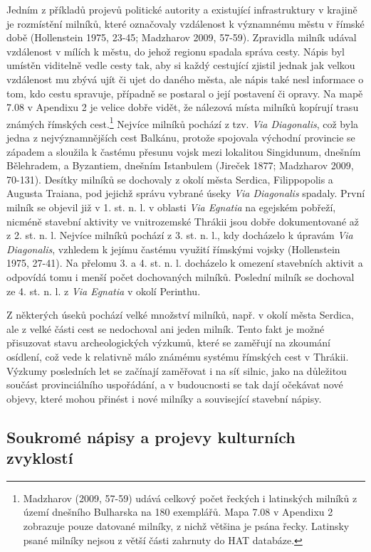 Jedním z příkladů projevů politické autority a existující infrastruktury v krajině je rozmístění milníků, které označovaly vzdálenost k významnému městu v římské době (Hollenstein 1975, 23-45; Madzharov 2009, 57-59). Zpravidla milník udával vzdálenost v mílích k městu, do jehož regionu spadala správa cesty. Nápis byl umístěn viditelně vedle cesty tak, aby si každý cestující zjistil jednak jak velkou vzdálenost mu zbývá ujít či ujet do daného města, ale nápis také nesl informace o tom, kdo cestu spravuje, případně se postaral o její postavení či opravy. Na mapě 7.08 v Apendixu 2 je velice dobře vidět, že nálezová místa milníků kopírují trasu známých římských cest.\footnote{Madzharov (2009, 57-59) udává celkový počet řeckých i latinských milníků z území dnešního Bulharska na 180 exemplářů. Mapa 7.08 v Apendixu 2 zobrazuje pouze datované milníky, z nichž většina je psána řecky. Latinsky psané milníky nejsou z větší části zahrnuty do HAT databáze.} Nejvíce milníků pochází z tzv. {\em Via Diagonalis}, což byla jedna z nejvýznamnějších cest Balkánu, protože spojovala východní provincie se západem a sloužila k častému přesunu vojsk mezi lokalitou Singidunum, dnešním Bělehradem, a Byzantiem, dnešním Istanbulem (Jireček 1877; Madzharov 2009, 70-131). Desítky milníků se dochovaly z okolí města Serdica, Filippopolis a Augusta Traiana, pod jejichž správu vybrané úseky {\em Via Diagonalis} spadaly. První milník se objevil již v 1. st. n. l. v oblasti {\em Via Egnatia} na egejském pobřeží, nicméně stavební aktivity ve vnitrozemské Thrákii jsou dobře dokumentované až z 2. st. n. l. Nejvíce milníků pochází z 3. st. n. l., kdy docházelo k úpravám {\em Via Diagonalis}, vzhledem k jejímu častému využití římskými vojsky (Hollenstein 1975, 27-41). Na přelomu 3. a 4. st. n. l. docházelo k omezení stavebních aktivit a odpovídá tomu i menší počet dochovaných milníků. Poslední milník se dochoval ze 4. st. n. l. z {\em Via Egnatia} v okolí Perinthu.

Z některých úseků pochází velké množství milníků, např. v okolí města Serdica, ale z velké části cest se nedochoval ani jeden milník. Tento fakt je možné přisuzovat stavu archeologických výzkumů, které se zaměřují na zkoumání osídlení, což vede k relativně málo známému systému římských cest v Thrákii. Výzkumy posledních let se začínají zaměřovat i na síť silnic, jako na důležitou součást provinciálního uspořádání, a v budoucnosti se tak dají očekávat nové objevy, které mohou přinést i nové milníky a související stavební nápisy.

\subsection[soukromé-nápisy-a-projevy-kulturních-zvyklostí]{Soukromé nápisy a projevy kulturních zvyklostí}

